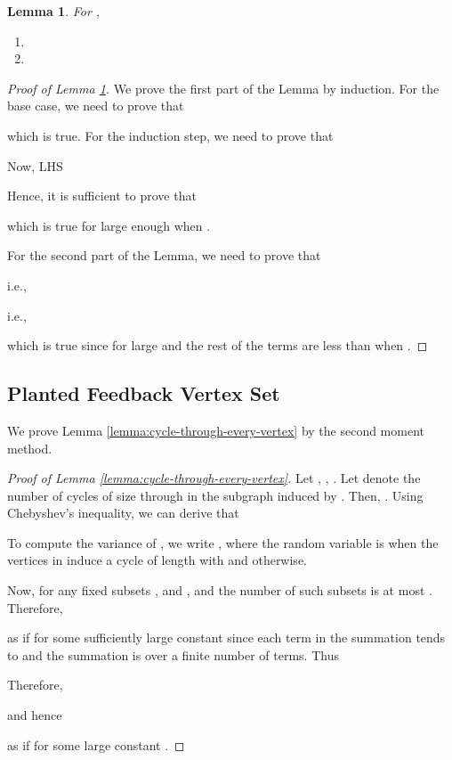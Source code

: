 \documentclass[11pt]{article}
\newtheorem{lemma}[theorem]{Lemma}
\begin{document}
\begin{lemma} \label{lemma:handler1}
For ,
\begin{enumerate}
\item

\item 

\end{enumerate}
\end{lemma}
\begin{proof} [Proof of Lemma \ref{lemma:handler1}]
We prove the first part of the Lemma by induction. For the base case, we need to prove that

which is true.
For the induction step, we need to prove that


Now, LHS

Hence, it is sufficient to prove that

which is true for large enough  when .

For the second part of the Lemma, we need to prove that


i.e., 

i.e.,

which is true since  for large  and the rest of the terms are less than  when .

\end{proof}

\subsection{Planted Feedback Vertex Set}
We prove Lemma \ref{lemma:cycle-through-every-vertex} by the second moment method.
\begin{proof}[Proof of Lemma \ref{lemma:cycle-through-every-vertex}]
Let , , . Let  denote the number of cycles of size  through  in the subgraph induced by . Then, . Using Chebyshev's inequality, we can derive that

To compute the variance of , we write , where the random variable  is  when the vertices in  induce a cycle of length  with  and  otherwise.


Now, for any fixed subsets ,  and ,  and the number of such subsets is at most . Therefore,


as  if  for some sufficiently large constant  since each term in the summation tends to  and the summation is over a finite number of terms. Thus

Therefore,

and hence

as  if  for some large constant .
\end{proof}
\end{document}

